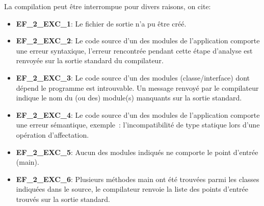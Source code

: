 {} %
{
La compilation peut être interrompue pour divers raisons, on cite:

	\begin{itemize}
  	\item \textbf {EF\_2\_EXC\_1}: Le fichier de sortie n'a pu être créé.
  	\item  \textbf {EF\_2\_EXC\_2}: Le code source d'un des modules de l'application comporte une erreur syntaxique, l'erreur rencontrée pendant cette étape d'analyse est renvoyée sur la sortie standard du compilateur.
  	\item \textbf {EF\_2\_EXC\_3}: Le code source d'un des modules (classe/interface) dont dépend le programme est introuvable. Un message renvoyé par le compilateur indique le nom du (ou des) module(s) manquants sur la sortie standard.
  	\item \textbf {EF\_2\_EXC\_4}: Le code source d'un des modules de l'application comporte une erreur sémantique, exemple : l'incompatibilité de type statique lors d'une opération d'affectation.
  	\item \textbf {EF\_2\_EXC\_5}: Aucun des modules indiqués ne comporte le point d'entrée (main).
  	\item \textbf {EF\_2\_EXC\_6}: Plusieurs méthodes main ont été trouvées parmi les classes indiquées dans le source, le compilateur renvoie la liste des points d'entrée trouvés sur la sortie standard.
  	\end {itemize}
 } %


